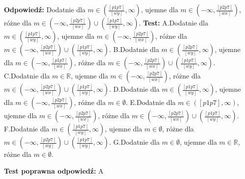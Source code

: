 \documentclass[12pt, a4paper]{article}
\theoremstyle{definition} %
\theoremstyle{definition} %
\newcommand{\rozwStop}{\newline}                                            %
\newcommand{\odpStart}{\noindent \textbf{Odpowiedź:}\newline}    %
\newcommand{\odpStop}{\newline}                                             %
\newcommand{\testStart}{\noindent \textbf{Test:}\newline} %
\newcommand{\testStop}{\newline} %
\newcommand{\kluczStart}{\noindent \textbf{Test poprawna odpowiedź:}\newline} %
\newcommand{\kluczStop}{\newline} %
\begin{document}
\rozwStop
\odpStart
Dodatnie dla $m\in\left(\frac{[p1p7]}{[wy]} ,\infty\right)$, ujemne dla $m\in\left(-\infty,\frac{[p2p7]}{[wx]} \right) $, różne dla $m\in\left(-\infty,\frac{[p2p7]}{[wx]} \right) \cup \left(\frac{[p1p7]}{[wy]}  ,\infty\right)$.
\odpStop
\testStart
A.Dodatnie dla $m\in\left(\frac{[p1p7]}{[wy]} ,\infty\right)$, ujemne dla $m\in\left(-\infty,\frac{[p2p7]}{[wx]} \right) $, różne dla $m\in\left(-\infty,\frac{[p2p7]}{[wx]} \right) \cup \left(\frac{[p1p7]}{[wy]}  ,\infty\right)$.
B.Dodatnie dla $m\in\left(\frac{[p2p7]}{[wy]} ,\infty\right)$, ujemne dla $m\in\left(-\infty,\frac{[p1p7]}{[wx]} \right) $, różne dla $m\in\left(-\infty,\frac{[p2p7]}{[wx]} \right) \cup \left(\frac{[p1p7]}{[wy]}  ,\infty\right)$.
C.Dodatnie dla $m\in\mathbb{R}$, ujemne dla $m\in\left(-\infty,\frac{[p2p7]}{[wx]} \right) $, różne dla $m\in\left(-\infty,\frac{[p2p7]}{[wx]} \right) \cup \left(\frac{[p1p7]}{[wy]}  ,\infty\right)$.
D.Dodatnie dla $m\in\left(\frac{[p1p7]}{[wy]} ,\infty\right)$, ujemne dla $m\in\left(-\infty,\frac{[p2p7]}{[wx]} \right) $, różne dla $m\in\emptyset$.
E.Dodatnie dla $m\in\left([p1p7] ,\infty\right)$, ujemne dla $m\in\left(-\infty,\frac{[p2p7]}{[wx]} \right) $, różne dla $m\in\left(-\infty,\frac{[p2p7]}{[wx]} \right) \cup \left(\frac{[p1p7]}{[wy]}  ,\infty\right)$.
F.Dodatnie dla $m\in\left(\frac{[p1p7]}{[wy]} ,\infty\right)$, ujemne dla $m\in\emptyset$, różne dla $m\in\left(-\infty,\frac{[p2p7]}{[wy]} \right) \cup \left(\frac{[p1p7]}{[wy]}  ,\infty\right)$.
G.Dodatnie dla $m\in\emptyset$, ujemne dla $m\in\mathbb{R} $, różne dla $m\in\emptyset$.

\testStop
\kluczStart
A
\kluczStop
\end{document}
